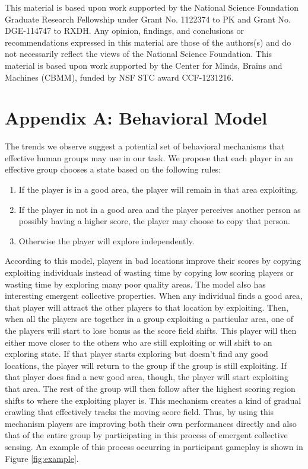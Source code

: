 \documentclass[12pt,letterpaper]{article}
\begin{document}
\small

This material is based upon work supported by the National Science
Foundation Graduate Research Fellowship under Grant No. 1122374 to PK
and Grant No. DGE-114747 to RXDH. Any opinion, findings, and
conclusions or recommendations expressed in this material are those of
the authors(s) and do not necessarily reflect the views of the
National Science Foundation.  This material is based upon work
supported by the Center for Minds, Brains and Machines (CBMM), funded
by NSF STC award CCF-1231216.




\setlength{\bibleftmargin}{.125in}
\setlength{\bibindent}{-\bibleftmargin}

\small{
  
}


\section*{Appendix A: Behavioral Model}

The trends we observe suggest a potential set of behavioral mechanisms
that effective human groups may use in our task.  We propose that each
player in an effective group chooses a state based on the following
rules:
\begin{enumerate}
\item
  If the player is in a good area, the player will remain in that area
  exploiting.
\item
  If the player in not in a good area and the player perceives another
  person as possibly having a higher score, the player may choose to
  copy that person.
\item
  Otherwise the player will explore independently.
\end{enumerate}

According to this model, players in bad locations improve their scores
by copying exploiting individuals instead of wasting time by copying
low scoring players or wasting time by exploring many poor quality
areas.  The model also has interesting emergent collective properties.
When any individual finds a good area, that player will attract the
other players to that location by exploiting.  Then, when all the
players are together in a group exploiting a particular area, one of
the players will start to lose bonus as the score field shifts.  This
player will then either move closer to the others who are still
exploiting or will shift to an exploring state.  If that player starts
exploring but doesn't find any good locations, the player will return
to the group if the group is still exploiting.  If that player does
find a new good area, though, the player will start exploiting that
area.  The rest of the group will then follow after the highest
scoring region shifts to where the exploiting player is.  This
mechanism creates a kind of gradual crawling that effectively tracks
the moving score field.  Thus, by using this mechanism players are
improving both their own performances directly and also that of the
entire group by participating in this process of emergent collective
sensing.  An example of this process occurring in participant gameplay
is shown in Figure \ref{fig:example}.
\end{document}

